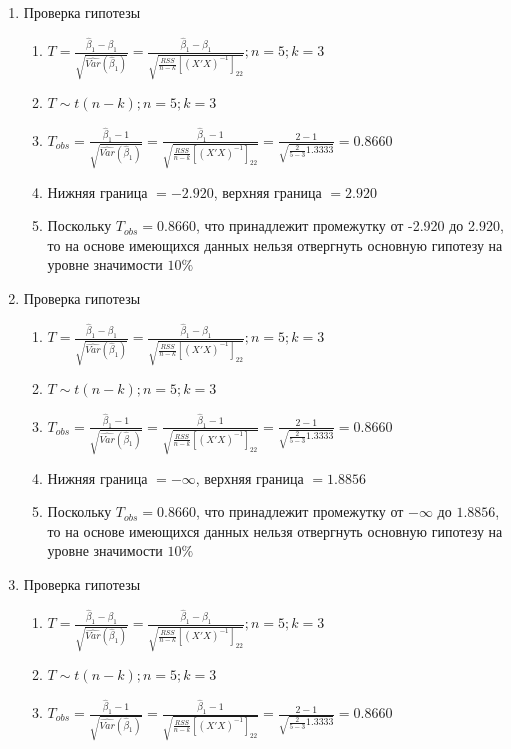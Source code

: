 \documentclass[pdftex,11pt,openany]{book}\usepackage[]{graphicx}\usepackage[]{color}
\begin{document}
\begin{solution}
\begin{enumerate}
\item Проверка гипотезы
\begin{enumerate}
\item $T = \frac{\hat{\beta}_1 - \beta_1}{\sqrt{\widehat{Var}(\hat{\beta}_1)}} = \frac {\hat{\beta}_1 - \beta_1}{\sqrt{{\frac{RSS}{n-k}}[(X'X)^{-1}]_{22}}}; n = 5; k = 3$
\item $T \sim t(n-k); n = 5; k = 3$
\item $T_{obs} = \frac{\hat{\beta}_1 - 1}{\sqrt{\widehat{Var}(\hat{\beta}_1)}} = \frac {\hat{\beta}_1 - 1}{\sqrt{{\frac{RSS}{n-k}}[(X'X)^{-1}]_{22}}} = \frac{2-1}{\sqrt{{\frac{2}{5-3}}1.3333}} = 0.8660$
\item Нижняя граница $= -2.920$, верхняя граница $= 2.920$
\item Поскольку $T_{obs} = 0.8660$, что принадлежит промежутку от -2.920 до 2.920, то на основе имеющихся данных нельзя отвергнуть основную гипотезу на уровне значимости $10\%$
\end{enumerate}
\item Проверка гипотезы
\begin{enumerate}
\item $T = \frac{\hat{\beta}_1 - \beta_1}{\sqrt{\widehat{Var}(\hat{\beta}_1)}} = \frac {\hat{\beta}_1 - \beta_1}{\sqrt{{\frac{RSS}{n-k}}[(X'X)^{-1}]_{22}}}; n = 5; k = 3$
\item $T \sim t(n-k); n = 5; k = 3$
\item $T_{obs} = \frac{\hat{\beta}_1 - 1}{\sqrt{\widehat{Var}(\hat{\beta}_1)}} = \frac {\hat{\beta}_1 - 1}{\sqrt{{\frac{RSS}{n-k}}[(X'X)^{-1}]_{22}}} = \frac{2-1}{\sqrt{{\frac{2}{5-3}}1.3333}} = 0.8660$
\item Нижняя граница $= -\infty$, верхняя граница $= 1.8856$
\item Поскольку $T_{obs} = 0.8660$, что принадлежит промежутку от $-\infty$ до $1.8856$, то на основе имеющихся данных нельзя отвергнуть основную гипотезу на уровне значимости $10\%$
\end{enumerate}
\item Проверка гипотезы
\begin{enumerate}
\item $T = \frac{\hat{\beta}_1 - \beta_1}{\sqrt{\widehat{Var}(\hat{\beta}_1)}} = \frac {\hat{\beta}_1 - \beta_1}{\sqrt{{\frac{RSS}{n-k}}[(X'X)^{-1}]_{22}}}; n = 5; k = 3$
\item $T \sim t(n-k); n = 5; k = 3$
\item $T_{obs} = \frac{\hat{\beta}_1 - 1}{\sqrt{\widehat{Var}(\hat{\beta}_1)}} = \frac {\hat{\beta}_1 - 1}{\sqrt{{\frac{RSS}{n-k}}[(X'X)^{-1}]_{22}}} = \frac{2-1}{\sqrt{{\frac{2}{5-3}}1.3333}} = 0.8660$

\end{enumerate}
\end{enumerate}
\end{solution}
\end{document}
